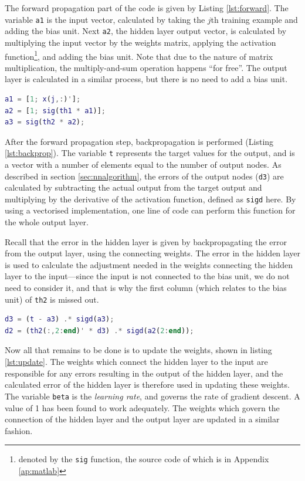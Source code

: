 The forward propagation part of the code is given by Listing \ref{lst:forward}.  The variable {\tt a1} is the input vector, calculated by taking the $j$th training example and adding the bias unit.  Next {\tt a2}, the hidden layer output vector, is calculated by multiplying the input vector by the weights matrix, applying the activation function\footnote{denoted by the {\tt sig} function, the source code of which is in Appendix \ref{ap:matlab}}, and adding the bias unit.  Note that due to the nature of matrix multiplication, the multiply-and-sum operation happens ``for free''.  The output layer is calculated in a similar process, but there is no need to add a bias unit.

\begin{lstlisting}[language=Matlab,label=lst:forward,caption={Forward propagation code},captionpos=b]
a1 = [1; x(j,:)'];
a2 = [1; sig(th1 * a1)];
a3 = sig(th2 * a2);
\end{lstlisting}

After the forward propagation step, backpropagation is performed (Listing \ref{lst:backprop}).  The variable {\tt t} represents the target values for the output, and is a vector with a number of elements equal to the number of output nodes.  As described in section \ref{sec:nnalgorithm}, the errors of the output nodes ({\tt d3}) are calculated by subtracting the actual output from the target output and multiplying by the derivative of the activation function, defined as {\tt sigd} here.  By using a vectorised implementation, one line of code can perform this function for the whole output layer.

Recall that the error in the hidden layer is given by backpropagating the error from the output layer, using the connecting weights.  The error in the hidden layer is used to calculate the adjustment needed in the weights connecting the hidden layer to the input---since the input is not connected to the bias unit, we do not need to consider it, and that is why the first column (which relates to the bias unit) of {\tt th2} is missed out.

\begin{lstlisting}[language=Matlab,label=lst:backprop,caption={Backpropagation code},captionpos=b]
d3 = (t - a3) .* sigd(a3);
d2 = (th2(:,2:end)' * d3) .* sigd(a2(2:end));
\end{lstlisting}

Now all that remains to be done is to update the weights, shown in listing \ref{lst:update}.  The weights which connect the hidden layer to the input are responsible for any errors resulting in the output of the hidden layer, and the calculated error of the hidden layer is therefore used in updating these weights.  The variable {\tt beta} is the \emph{learning rate}, and governs the rate of gradient descent.  A value of 1 has been found to work adequately.  The weights which govern the connection of the hidden layer and the output layer are updated in a similar fashion.

